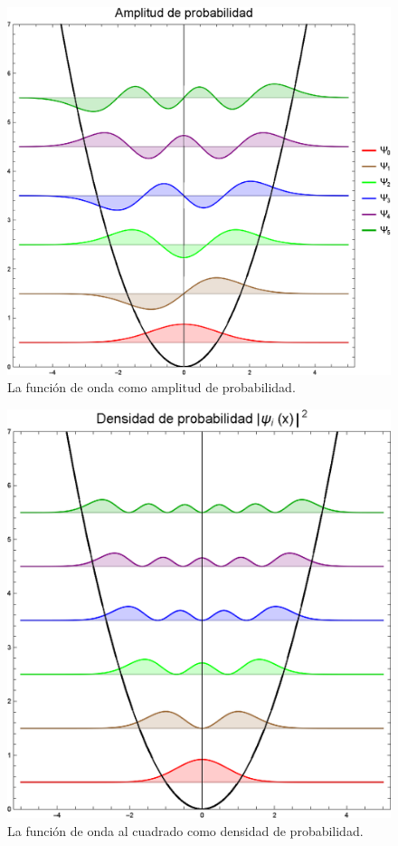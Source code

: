 \documentclass[12pt]{article}
\numberwithin{equation}{section}
\begin{document}
\begin{figure}[H]
    \centering
    \includegraphics[scale=1]{Imagenes/Plot_Hermite_Oscilador_01_Amplitud.eps}
    \caption{La función de onda como amplitud de probabilidad.}
    \label{fig_figura_funcion_amplitud}
\end{figure}
\begin{figure}[H]
    \centering
    \includegraphics[scale=1]{Imagenes/Plot_Hermite_Oscilador_02_Densidad.eps}
    \caption{La función de onda al cuadrado como densidad de probabilidad.}
    \label{fig_figura_funcion_densidad}
\end{figure}
\end{document}
